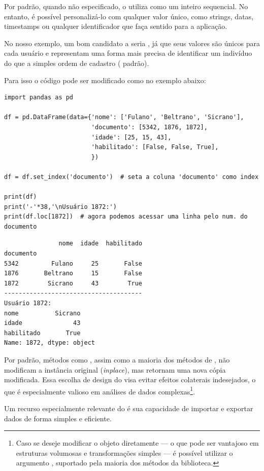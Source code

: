 Por padrão, quando não especificado, o  utiliza como  um inteiro sequencial.
No entanto, é possível personalizá-lo com qualquer valor único, como strings, datas, timestamps ou qualquer identificador que
faça sentido para a aplicação.

No nosso exemplo, um bom candidato a  seria , já que seus valores são únicos para
cada usuário e representam uma forma mais precisa de identificar um indivíduo do que a simples ordem de
cadastro ( padrão).

Para isso o código pode ser modificado como no exemplo abaixo:
\begin{verbatim}
import pandas as pd

df = pd.DataFrame(data={'nome': ['Fulano', 'Beltrano', 'Sicrano'],
                        'documento': [5342, 1876, 1872],
                        'idade': [25, 15, 43],
                        'habilitado': [False, False, True],
                        })

df = df.set_index('documento')  # seta a coluna 'documento' como index

print(df)
print('-'*38,'\nUsuário 1872:')
print(df.loc[1872])  # agora podemos acessar uma linha pelo num. do documento
\end{verbatim}
\begin{verbatim}
               nome  idade  habilitado
documento
5342         Fulano     25       False
1876       Beltrano     15       False
1872        Sicrano     43        True
--------------------------------------
Usuário 1872:
nome          Sicrano
idade              43
habilitado       True
Name: 1872, dtype: object
\end{verbatim}

Por padrão, métodos como , assim como a maioria dos métodos de ,
não modificam a instância original (\emph{inplace}), mas retornam uma nova cópia modificada.
Essa escolha de design do  visa evitar efeitos colaterais indesejados, o que é especialmente valioso
em análises de dados complexas\footnote{Caso se deseje modificar o objeto diretamente --- o que pode ser vantajoso em
estruturas volumosas e transformações simples --- é possível utilizar o argumento , suportado
pela maioria dos métodos da biblioteca.}.


Um recurso especialmente relevante do  é sua capacidade de importar e exportar dados 
de forma simples e eficiente.

